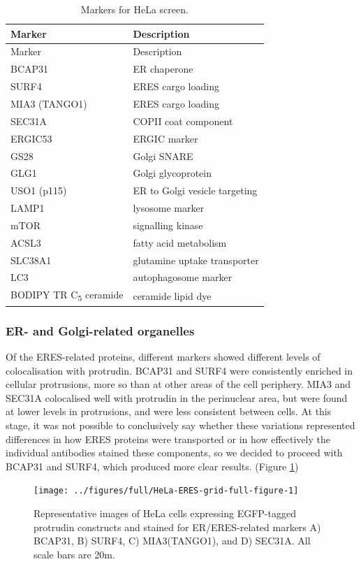 \documentclass[
  12pt,
  a4paper,
]{book}
\begin{document}
\begin{longtable}[]{@{}ll@{}}
\caption{\label{tab:unnamed-chunk-1}Markers for HeLa screen.}\tabularnewline
\toprule()
Marker & Description \\
\midrule()
\endfirsthead
\toprule()
Marker & Description \\
\midrule()
\endhead
BCAP31 & ER chaperone \\
SURF4 & ERES cargo loading \\
MIA3 (TANGO1) & ERES cargo loading \\
SEC31A & COPII coat component \\
ERGIC53 & ERGIC marker \\
GS28 & Golgi SNARE \\
GLG1 & Golgi glycoprotein \\
USO1 (p115) & ER to Golgi vesicle targeting \\
LAMP1 & lysosome marker \\
mTOR & signalling kinase \\
ACSL3 & fatty acid metabolism \\
SLC38A1 & glutamine uptake transporter \\
LC3 & autophagosome marker \\
BODIPY TR C\textsubscript{5} ceramide & ceramide lipid dye \\
\bottomrule()
\end{longtable}

\hypertarget{er--and-golgi-related-organelles}{%
\subsubsection{ER- and Golgi-related organelles}\label{er--and-golgi-related-organelles}}

Of the ERES-related proteins, different markers showed different levels of colocalisation with protrudin. BCAP31 and SURF4 were consistently enriched in cellular protrusions, more so than at other areas of the cell periphery. MIA3 and SEC31A colocalised well with protrudin in the perinuclear area, but were found at lower levels in protrusions, and were less consistent between cells. At this stage, it was not possible to conclusively say whether these variations represented differences in how ERES proteins were transported or in how effectively the individual antibodies stained these components, so we decided to proceed with BCAP31 and SURF4, which produced more clear results. (Figure \ref{fig:HeLa-ERES-grid-full-figure})

\begin{figure}
\texttt{[image: ../figures/full/HeLa-ERES-grid-full-figure-1]} \caption[Protrudin-expressing HeLa cells stained for BCAP31, SURF4, MIA3, and SEC31A]{Representative images of HeLa cells expressing EGFP-tagged protrudin constructs and stained for ER/ERES-related markers A) BCAP31, B) SURF4, C) MIA3(TANGO1), and D) SEC31A.  All scale bars are 20\textmu{}m.}\label{fig:HeLa-ERES-grid-full-figure}
\end{figure}
\end{document}
